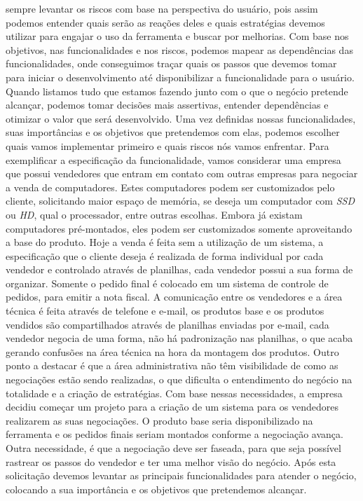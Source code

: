       sempre levantar os riscos com base na perspectiva do usuário, pois assim
      podemos entender quais serão as reações deles e quais estratégias devemos
      utilizar para engajar o uso da ferramenta e buscar por melhorias. Com base
      nos objetivos, nas funcionalidades e nos riscos, podemos mapear as dependências
      das funcionalidades, onde conseguimos traçar quais os passos que devemos tomar
      para iniciar o desenvolvimento até disponibilizar a funcionalidade para o
      usuário. \newline
      Quando listamos tudo que estamos fazendo junto com o que o negócio pretende
      alcançar, podemos tomar decisões mais assertivas, entender dependências e
      otimizar o valor que será desenvolvido. Uma vez definidas nossas funcionalidades,
      suas importâncias e os objetivos que pretendemos com elas, podemos escolher
      quais vamos implementar primeiro e quais riscos nós vamos enfrentar. Para
      exemplificar a especificação da funcionalidade, vamos considerar uma empresa
      que possui vendedores que entram em contato com outras empresas para negociar
      a venda de computadores. Estes computadores podem ser customizados pelo cliente,
      solicitando maior espaço de memória, se deseja um computador com \textit{SSD}
      ou \textit{HD}, qual o processador, entre outras escolhas. Embora já existam
      computadores pré-montados, eles podem ser customizados somente aproveitando
      a base do produto. \newline
      Hoje a venda é feita sem a utilização de um sistema, a especificação que o
      cliente deseja é realizada de forma individual por cada vendedor e controlado
      através de planilhas, cada vendedor possui a sua forma de organizar. Somente
      o pedido final é colocado em um sistema de controle de pedidos, para emitir a
      nota fiscal. A comunicação entre os vendedores e a área técnica é feita através
      de telefone e e-mail, os produtos base e os produtos vendidos são compartilhados
      através de planilhas enviadas por e-mail, cada vendedor negocia de uma forma,
      não há padronização nas planilhas, o que acaba gerando confusões na área
      técnica na hora da montagem dos produtos. Outro ponto a destacar é que a
      área administrativa não têm visibilidade de como as negociações estão sendo
      realizadas, o que dificulta o entendimento do negócio na totalidade e a criação
      de estratégias. \newline
      Com base nessas necessidades, a empresa decidiu começar um projeto para a
      criação de um sistema para os vendedores realizarem as suas negociações.
      O produto base seria disponibilizado na ferramenta e os pedidos finais
      seriam montados conforme a negociação avança. Outra necessidade, é que a
      negociação deve ser faseada, para que seja possível rastrear os passos do
      vendedor e ter uma melhor visão do negócio. Após esta solicitação devemos
      levantar as principais funcionalidades para atender o negócio, colocando
      a sua importância e os objetivos que pretendemos alcançar. \newline

